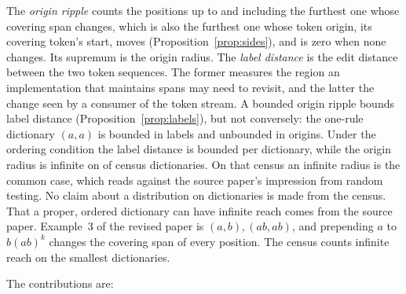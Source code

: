 \documentclass[11pt,a4paper]{article}
\theoremstyle{definition}
\theoremstyle{plain}
\begin{document}
The \emph{origin ripple} counts the positions up to and including the furthest one whose covering span changes, which is
also the furthest one whose token origin, its covering token's start, moves (Proposition~\ref{prop:sides}), and is zero
when none changes. Its supremum is the origin radius. The \emph{label distance} is the edit distance between the two
token sequences. The former measures the region an implementation that maintains spans may need to revisit, and the
latter the change seen by a consumer of the token stream. A bounded origin ripple bounds label distance
(Proposition~\ref{prop:labels}), but not conversely: the one-rule dictionary \((a, a)\) is bounded in labels and
unbounded in origins. Under the ordering condition the label distance is bounded per dictionary, while the origin radius
is infinite on \CensusUnbounded{} of \CensusTotal{} census dictionaries. On that census an infinite radius is the common
case, which reads against the source paper's impression from random testing. No claim about a distribution on
dictionaries is made from the census. That a proper, ordered dictionary can have infinite reach comes from the source
paper. Example~3 of the revised paper is \((a, b), (ab, ab)\), and prepending \(a\) to \(b(ab)^k\) changes the covering
span of every position. The census counts infinite reach on the smallest dictionaries.

The contributions are:
\end{document}
